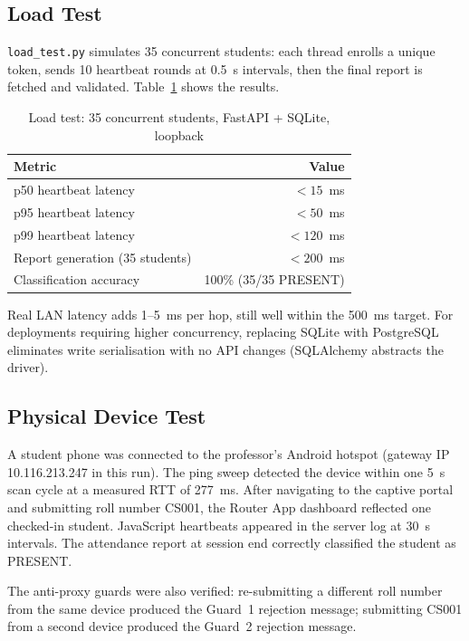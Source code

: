 \documentclass[sigconf,nonacm]{acmart}
\begin{document}
\subsection{Load Test}

\texttt{load\_test.py} simulates 35 concurrent students: each thread
enrolls a unique token, sends 10 heartbeat rounds at 0.5~s intervals,
then the final report is fetched and validated.
Table~\ref{tab:load} shows the results.

\begin{table}[h]
\caption{Load test: 35 concurrent students, FastAPI + SQLite, loopback}
\label{tab:load}
\begin{tabular}{lr}
\toprule
Metric & Value \\
\midrule
p50 heartbeat latency      & $<15$~ms  \\
p95 heartbeat latency      & $<50$~ms  \\
p99 heartbeat latency      & $<120$~ms \\
Report generation (35 students) & $<200$~ms \\
Classification accuracy    & 100\% (35/35 PRESENT) \\
\bottomrule
\end{tabular}
\end{table}

Real LAN latency adds 1--5~ms per hop, still well within the 500~ms
target.  For deployments requiring higher concurrency, replacing SQLite
with PostgreSQL eliminates write serialisation with no API changes
(SQLAlchemy abstracts the driver).

\subsection{Physical Device Test}

A student phone was connected to the professor's Android hotspot (gateway
IP 10.116.213.247 in this run).  The ping sweep detected the device
within one 5~s scan cycle at a measured RTT of 277~ms.  After navigating
to the captive portal and submitting roll number CS001, the Router App
dashboard reflected one checked-in student.  JavaScript heartbeats
appeared in the server log at 30~s intervals.  The attendance report at
session end correctly classified the student as PRESENT.

The anti-proxy guards were also verified: re-submitting a different roll
number from the same device produced the Guard~1 rejection message;
submitting CS001 from a second device produced the Guard~2 rejection
message.
\end{document}
